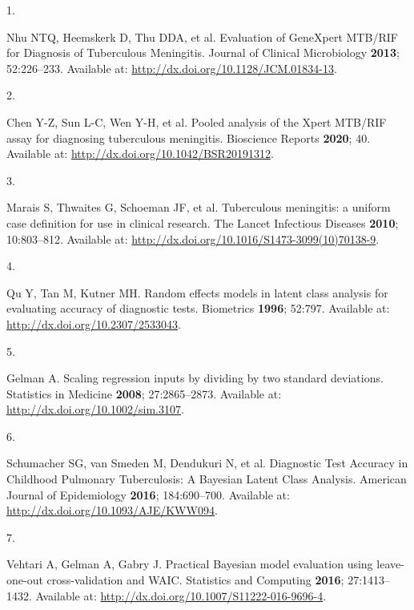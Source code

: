 \documentclass[
]{article}
\newlength{\cslhangindent}
\newlength{\csllabelwidth}
\newlength{\cslentryspacingunit} %
\newenvironment{CSLReferences}[2] %
 {%
  \setlength{\parindent}{0pt}
  \ifodd #1
  \let\oldpar\par
  \def\par{\hangindent=\cslhangindent\oldpar}
  \fi
  \setlength{\parskip}{#2\cslentryspacingunit}
 }%
 {}
\newcommand{\CSLLeftMargin}[1]{\parbox[t]{\csllabelwidth}{#1}}
\newcommand{\CSLRightInline}[1]{\parbox[t]{\linewidth - \csllabelwidth}{#1}\break}
\begin{document}
\hypertarget{refs}{}
\begin{CSLReferences}{0}{0}
\leavevmode{}%
\CSLLeftMargin{1. }
\CSLRightInline{Nhu NTQ, Heemskerk D, Thu DDA, et al. Evaluation of GeneXpert MTB/RIF for Diagnosis of Tuberculous Meningitis. Journal of Clinical Microbiology \textbf{2013}; 52:226--233. Available at: \url{http://dx.doi.org/10.1128/JCM.01834-13}.}

\leavevmode{}%
\CSLLeftMargin{2. }
\CSLRightInline{Chen Y-Z, Sun L-C, Wen Y-H, et al. Pooled analysis of the Xpert MTB/RIF assay for diagnosing tuberculous meningitis. Bioscience Reports \textbf{2020}; 40. Available at: \url{http://dx.doi.org/10.1042/BSR20191312}.}

\leavevmode{}%
\CSLLeftMargin{3. }
\CSLRightInline{Marais S, Thwaites G, Schoeman JF, et al. Tuberculous meningitis: a uniform case definition for use in clinical research. The Lancet Infectious Diseases \textbf{2010}; 10:803--812. Available at: \url{http://dx.doi.org/10.1016/S1473-3099(10)70138-9}.}

\leavevmode{}%
\CSLLeftMargin{4. }
\CSLRightInline{Qu Y, Tan M, Kutner MH. Random effects models in latent class analysis for evaluating accuracy of diagnostic tests. Biometrics \textbf{1996}; 52:797. Available at: \url{http://dx.doi.org/10.2307/2533043}.}

\leavevmode{}%
\CSLLeftMargin{5. }
\CSLRightInline{Gelman A. Scaling regression inputs by dividing by two standard deviations. Statistics in Medicine \textbf{2008}; 27:2865--2873. Available at: \url{http://dx.doi.org/10.1002/sim.3107}.}

\leavevmode{}%
\CSLLeftMargin{6. }
\CSLRightInline{Schumacher SG, van Smeden M, Dendukuri N, et al. Diagnostic Test Accuracy in Childhood Pulmonary Tuberculosis: A Bayesian Latent Class Analysis. American Journal of Epidemiology \textbf{2016}; 184:690--700. Available at: \url{http://dx.doi.org/10.1093/AJE/KWW094}.}

\leavevmode{}%
\CSLLeftMargin{7. }
\CSLRightInline{Vehtari A, Gelman A, Gabry J. Practical Bayesian model evaluation using leave-one-out cross-validation and WAIC. Statistics and Computing \textbf{2016}; 27:1413--1432. Available at: \url{http://dx.doi.org/10.1007/S11222-016-9696-4}.}


\end{CSLReferences}
\end{document}
